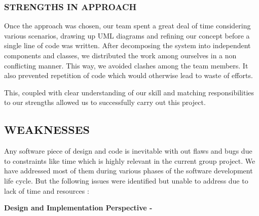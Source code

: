 \documentclass[11pt,a4paper]{article}
\begin{document}
		\subsubsection{STRENGTHS IN APPROACH}
		Once the approach was chosen, our team spent a great deal of time considering various scenarios, drawing up UML diagrams and refining our concept before a single line of code was written. After decomposing the system into independent components and classes, we distributed the work among ourselves in a non conflicting manner. This way, we avoided clashes among the team members. It also prevented repetition of code which would otherwise lead to waste of efforts.
		
			This, coupled with clear understanding of our skill and matching responsibilities to our strengths allowed us to successfully carry out this project.
		
	\subsection{WEAKNESSES}
	Any software piece of design and code is inevitable with out flaws and bugs due to constraints like time which is highly relevant in the current group project. We have addressed most of them during various phases of the software development life cycle. But the following issues were identified but unable to address due to lack of time and resources :
	
	\textbf{Design and Implementation Perspective -}
	
\end{document}

